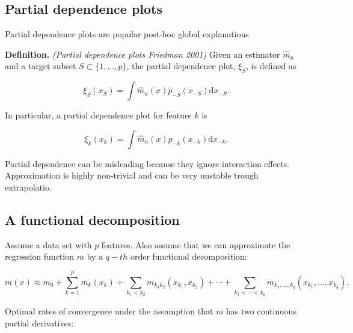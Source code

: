 \documentclass[a4paper,10pt,openany]{book}
\begin{document}
\hypertarget{partial-dependence-plots}{%
\subsection{Partial dependence plots}\label{partial-dependence-plots}}

Partial dependence plots are popular post-hoc global explanations

\textbf{Definition.} \emph{(Partial dependence plots Friedman 2001)} Given an estimator \(\hat m_n\) and a target subset \(S\subset \{1,\dots,p\}\), the partial dependence plot, \(\xi_S\), is defined as

\[
\xi_S(x_S)= \int \hat m_n(x) \hat p_{-S}(x_{-S})\mathrm dx_{-S}.
\]

In particular, a partial dependence plot for feature \(k\) is

\[
\xi_k(x_k)= \int \hat m_n(x) p_{-k}(x_{-k})\mathrm dx_{-k}.
\]

Partial dependence can be misleading because they ignore interaction effects. Approximation is highly non-trivial and can be very unstable trough extrapolatio.

\hypertarget{a-functional-decomposition}{%
\subsection{A functional decomposition}\label{a-functional-decomposition}}

Assume a data set with \(p\) features. Also assume that we can approximate the regression function \(m\) by a \(q-th\) order functional decomposition:

\[
m(x) \approx  m_0+\sum_{k=1}^p  m_k(x_{k}) + \sum_{k_1<k_2}  m_{k_1k_2}(x_{k_1},x_{k_2}) + \cdots +\sum_{k_1<\cdots <k_q}  m_{k_1,\dots,k_q} (x_{k_1},\dots,x_{k_q}).
\]

Optimal rates of convergence under the assumption that \(m\) has
two continuous partial derivatives:
\end{document}
